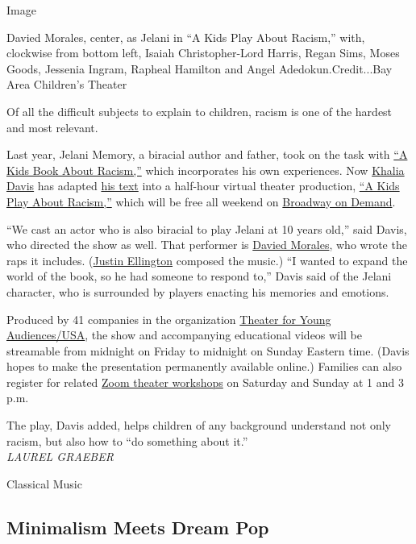Image

Davied Morales, center, as Jelani in ``A Kids Play About Racism,'' with,
clockwise from bottom left, Isaiah Christopher-Lord Harris, Regan Sims,
Moses Goods, Jessenia Ingram, Rapheal Hamilton and Angel
Adedokun.Credit...Bay Area Children's Theater

Of all the difficult subjects to explain to children, racism is one of
the hardest and most relevant.

Last year, Jelani Memory, a biracial author and father, took on the task
with
\href{https://akidsbookabout.com/products/a-kids-book-about-racism}{``A
Kids Book About Racism,''} which incorporates his own experiences. Now
\href{https://khaliadavis.com/}{Khalia Davis} has adapted
\href{https://www.youtube.com/watch?v=LnaltG5N8nE}{his text} into a
half-hour virtual theater production,
\href{https://www.akidsplayabout.org/}{``A Kids Play About Racism,''}
which will be free all weekend on
\href{https://www.broadwayondemand.com/series/teJ66dfuOEak-a-kids-play-about-racism}{Broadway
on Demand}.

``We cast an actor who is also biracial to play Jelani at 10 years
old,'' said Davis, who directed the show as well. That performer is
\href{https://www.youtube.com/watch?v=gWPOrq7qt_g}{Davied Morales}, who
wrote the raps it includes.
(\href{http://www.justinellington.com/}{Justin Ellington} composed the
music.) ``I wanted to expand the world of the book, so he had someone to
respond to,'' Davis said of the Jelani character, who is surrounded by
players enacting his memories and emotions.

Produced by 41 companies in the organization
\href{http://www.tyausa.org/}{Theater for Young Audiences/USA}, the show
and accompanying educational videos will be streamable from midnight on
Friday to midnight on Sunday Eastern time. (Davis hopes to make the
presentation permanently available online.) Families can also register
for related \href{https://www.akidsplayabout.org/more}{Zoom theater
workshops} on Saturday and Sunday at 1 and 3 p.m.

The play, Davis added, helps children of any background understand not
only racism, but also how to ``do something about it.''\\
\emph{LAUREL GRAEBER}

Classical Music

\hypertarget{minimalism-meets-dream-pop}{%
\subsection{Minimalism Meets Dream
Pop}\label{minimalism-meets-dream-pop}}

